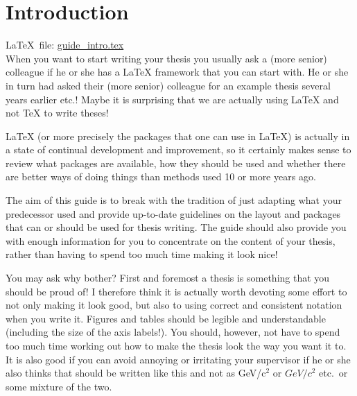 \chapter{Introduction}%
\label{sec:intro}

\LaTeX\ file: \href{run:./guide_intro.tex}{guide\_intro.tex}\\[1ex]
\noindent
When you want to start writing your thesis you usually ask a (more
senior) colleague if he or she has a \gls{LaTeX} framework that you can
start with. He or she in turn had asked their (more senior) colleague
for an example thesis several years earlier etc.! Maybe it is
surprising that we are actually using \LaTeX{} and not \TeX{} to write
theses!

\LaTeX{} (or more precisely the packages that one
can use in \LaTeX) is actually in a state of continual development
and improvement, so it certainly makes sense to review what packages
are available, how they should be used and whether there are better
ways of doing things than methods used 10 or more years ago.

The aim of this guide is to break with the tradition of just adapting
what your predecessor used and provide up-to-date guidelines on the
layout and packages that can or should be used for thesis writing. The
guide should also provide you with enough information for you to
concentrate on the content of your thesis, rather than having to spend
too much time making it look nice!

You may ask why bother? First and foremost a thesis is something that
you should be proud of! I therefore think it is actually worth
devoting some effort to not only making it look good, but also to
using correct and consistent notation when you write it. Figures and
tables should be legible and understandable (including the size of the
axis labels!). You should, however, not have to spend too much time
working out how to make the thesis look the way you want it to. It is
also good if you can avoid annoying or irritating your supervisor if he
or she also thinks that \unit{\GeVovercsq} should be written like this and
not as GeV/c\(^{2}\) or \(GeV/c^{2}\) etc.\ or some mixture of the two.

